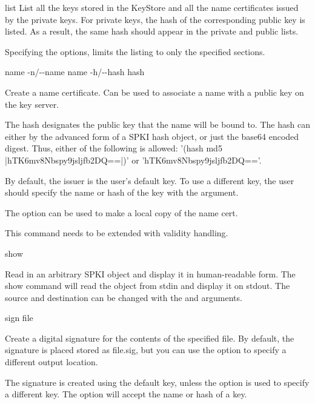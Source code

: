 \documentclass{howto}
\begin{document}
\begin{datadescni}{list   }
    List all the keys stored in the KeyStore and all the name
    certificates issued by the private keys.  For private keys, the
    hash of the corresponding public key is listed.  As a result, the
    same hash should appear in the private and public lists.  

    Specifying the options, limits the listing to only the specified
    sections.
\end{datadescni}
    
\begin{datadescni}{name  -n/-{}-name name -h/-{}-hash hash  }

    Create a name certificate.  Can be used to associate a name with a
    public key on the key server.

    The hash designates the public key that the name will be bound
    to.  The hash can either by the advanced form of a SPKI hash
    object, or just the base64 encoded digest.  Thus, either of the
    following is allowed: '(hash md5 |hTK6mv8Nbspy9jsljfb2DQ==|)' or
    'hTK6mv8Nbspy9jsljfb2DQ=='.

    By default, the issuer is the user's default key.  To use a
    different key, the user should specify the name or hash of the key
    with the \programopt{-} argument.

    The  option can be used to make a local copy of the
    name cert. 

    This command needs to be extended with validity handling.
\end{datadescni}

\begin{datadescni}{show  }

    Read in an arbitrary SPKI object and display it in human-readable
    form.  The show command will read the object from stdin and
    display it on stdout.  The source and destination can be changed
    with the  and  arguments.
\end{datadescni}
    
\begin{datadescni}{sign   file}

    Create a digital signature for the contents of the specified
    file.  By default, the signature is placed stored as file.sig, but
    you can use the  option to specify a different
    output location. 

    The signature is created using the default key, unless the
    \programopt{-} option is used to specify a
    different key.  The \programopt{-}
    option will accept the name or hash of a key.
\end{datadescni}
    
\end{document}
